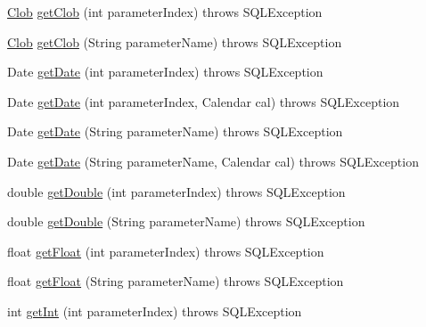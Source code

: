 \begin{DoxyCompactItemize}
\item 
\mbox{\hyperlink{classcom_1_1mysql_1_1cj_1_1jdbc_1_1_clob}{Clob}} \mbox{\hyperlink{classcom_1_1mysql_1_1cj_1_1jdbc_1_1_callable_statement_a24eab53dc2c5d9c0ca81d4ef1f9c4a68}{get\+Clob}} (int parameter\+Index)  throws S\+Q\+L\+Exception 
\item 
\mbox{\hyperlink{classcom_1_1mysql_1_1cj_1_1jdbc_1_1_clob}{Clob}} \mbox{\hyperlink{classcom_1_1mysql_1_1cj_1_1jdbc_1_1_callable_statement_a1d3b051adc98dcf98fe93762440fe605}{get\+Clob}} (String parameter\+Name)  throws S\+Q\+L\+Exception 
\item 
Date \mbox{\hyperlink{classcom_1_1mysql_1_1cj_1_1jdbc_1_1_callable_statement_a9280a0b05265e2def720a51151f8dc75}{get\+Date}} (int parameter\+Index)  throws S\+Q\+L\+Exception 
\item 
Date \mbox{\hyperlink{classcom_1_1mysql_1_1cj_1_1jdbc_1_1_callable_statement_a5ecd5b8ebee139edcf6cf5c6b79dee9d}{get\+Date}} (int parameter\+Index, Calendar cal)  throws S\+Q\+L\+Exception 
\item 
Date \mbox{\hyperlink{classcom_1_1mysql_1_1cj_1_1jdbc_1_1_callable_statement_aca6a4c290274e62c2f8f100e0c746728}{get\+Date}} (String parameter\+Name)  throws S\+Q\+L\+Exception 
\item 
Date \mbox{\hyperlink{classcom_1_1mysql_1_1cj_1_1jdbc_1_1_callable_statement_a5fa3659ab861ea6df99551e4811d7b22}{get\+Date}} (String parameter\+Name, Calendar cal)  throws S\+Q\+L\+Exception 
\item 
double \mbox{\hyperlink{classcom_1_1mysql_1_1cj_1_1jdbc_1_1_callable_statement_ab147f6da64dfa262ea1bed1a7c955c71}{get\+Double}} (int parameter\+Index)  throws S\+Q\+L\+Exception 
\item 
double \mbox{\hyperlink{classcom_1_1mysql_1_1cj_1_1jdbc_1_1_callable_statement_af7ea2799796fa396896066e857542937}{get\+Double}} (String parameter\+Name)  throws S\+Q\+L\+Exception 
\item 
float \mbox{\hyperlink{classcom_1_1mysql_1_1cj_1_1jdbc_1_1_callable_statement_ac5562c83206c020fe6126aafce30bd31}{get\+Float}} (int parameter\+Index)  throws S\+Q\+L\+Exception 
\item 
float \mbox{\hyperlink{classcom_1_1mysql_1_1cj_1_1jdbc_1_1_callable_statement_a60fdd6135ca3dd6e54bdb7ff62175103}{get\+Float}} (String parameter\+Name)  throws S\+Q\+L\+Exception 
\item 
int \mbox{\hyperlink{classcom_1_1mysql_1_1cj_1_1jdbc_1_1_callable_statement_ae1c1a3f79f99f2dd61c551a5579f9d00}{get\+Int}} (int parameter\+Index)  throws S\+Q\+L\+Exception 

\end{DoxyCompactItemize}
